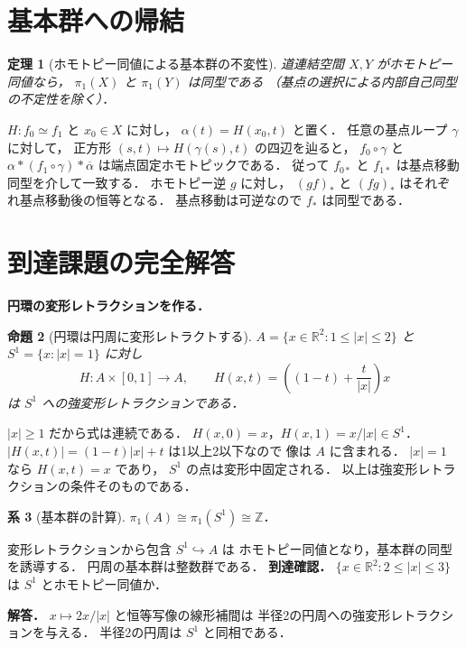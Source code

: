 \documentclass[a5paper,10pt,onecolumn]{jsarticle}
\makeatletter
\theoremstyle{mathnotetheorem}
\newtheorem{theorem}{定理}[section]
\newtheorem{proposition}[theorem]{命題}
\newtheorem{corollary}[theorem]{系}
\renewcommand{\proofname}{証明}
\renewenvironment{proof}[1][\proofname]{%
  \par\pushQED{\qed}\normalfont\topsep4\p@\@plus2\p@\relax
  \trivlist\item[\hskip\labelsep\bfseries #1]\ignorespaces
}{\popQED\endtrivlist\@endpefalse}
\makeatother
\begin{document}
\section{基本群への帰結}
\begin{theorem}[ホモトピー同値による基本群の不変性]
道連結空間 $X,Y$ がホモトピー同値なら，
$\pi_1(X)$ と $\pi_1(Y)$ は同型である
（基点の選択による内部自己同型の不定性を除く）．
\end{theorem}
\begin{proof}
$H:f_0\simeq f_1$ と $x_0\in X$ に対し，
$\alpha(t)=H(x_0,t)$ と置く．
任意の基点ループ $\gamma$ に対して，
正方形 $(s,t)\mapsto H(\gamma(s),t)$ の四辺を辿ると，
$f_0\circ\gamma$ と
$\alpha*(f_1\circ\gamma)*\overline\alpha$
は端点固定ホモトピックである．
従って $f_{0*}$ と $f_{1*}$ は基点移動同型を介して一致する．
ホモトピー逆 $g$ に対し，
$(gf)_*$ と $(fg)_*$ はそれぞれ基点移動後の恒等となる．
基点移動は可逆なので $f_*$ は同型である．
\end{proof}

\section{到達課題の完全解答}
\noindent\textbf{円環の変形レトラクションを作る．}
\begin{proposition}[円環は円周に変形レトラクトする]
$A=\{x\in\mathbb R^2:1\le |x|\le2\}$ と
$S^1=\{x:|x|=1\}$ に対し
\[
H:A\times[0,1]\to A,\qquad
H(x,t)=\left((1-t)+\frac t{|x|}\right)x
\]
は $S^1$ への強変形レトラクションである．
\end{proposition}
\begin{proof}
$|x|\ge1$ だから式は連続である．
$H(x,0)=x$，$H(x,1)=x/|x|\in S^1$．
$|H(x,t)|=(1-t)|x|+t$ は1以上2以下なので
像は $A$ に含まれる．
$|x|=1$ なら $H(x,t)=x$ であり，
$S^1$ の点は変形中固定される．
以上は強変形レトラクションの条件そのものである．
\end{proof}
\begin{corollary}[基本群の計算]
$\pi_1(A)\cong\pi_1(S^1)\cong\mathbb Z$．
\end{corollary}
\begin{proof}
変形レトラクションから包含 $S^1\hookrightarrow A$ は
ホモトピー同値となり，基本群の同型を誘導する．
円周の基本群は整数群である．
\end{proof}
\noindent\textbf{到達確認．}
$\{x\in\mathbb R^2:2\le |x|\le3\}$ は
$S^1$ とホモトピー同値か．
\par\noindent\textbf{解答．}
$x\mapsto2x/|x|$ と恒等写像の線形補間は
半径2の円周への強変形レトラクションを与える．
半径2の円周は $S^1$ と同相である．
\end{document}
